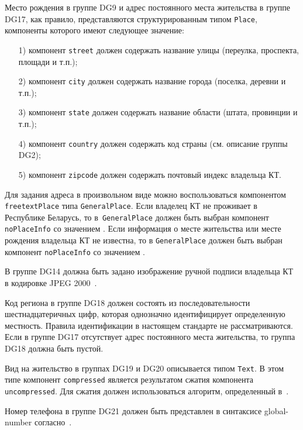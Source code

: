 Место рождения в группе DG9 и адрес постоянного места жительства в группе 
DG17, как правило, представляются структурированным типом \verb|Place|, 
компоненты которого имеют следующее значение: 

\begin{enumerate}
\item[1)]
компонент \verb|street| должен содержать название улицы (переулка, 
проспекта, площади и т.п.); 
\item[2)]
компонент \verb|city| должен содержать название города (поселка, деревни и т.п.); 
\item[3)]
компонент \verb|state| должен содержать название области (штата, провинции и т.п.);
\item[4)]
компонент \verb|country| должен содержать код страны (см. описание группы DG2);
\item[5)]
компонент \verb|zipcode| должен содержать почтовый индекс владельца КТ.
\end{enumerate}

Для задания адреса в произвольном виде можно воспользоваться компонентом 
\verb|freetextPlace| типа \verb|GeneralPlace|. Если владелец КТ не проживает в 
Республике Беларусь, то в~\verb|GeneralPlace| должен быть выбран компонент 
\verb|noPlaceInfo| со значением . 
Если информация о месте жительства или месте рождения владельца 
КТ не известна, то в \verb|GeneralPlace| 
должен быть выбран компонент \verb|noPlaceInfo| со значением 
. 


В группе DG14 должна быть задано изображение ручной подписи
владельца КТ в кодировке JPEG 2000~\cite{JPEG2000}.

Код региона в группе DG18 должен состоять из последовательности 
шестнадцатеричных цифр, которая однозначно идентифицирует определенную 
местность. Правила идентификации в настоящем стандарте не рассматриваются. 
Если в группе DG17 отсутствует адрес постоянного места жительства, то 
группа DG18 должна быть пустой. 

Вид на жительство в группах DG19 и DG20 описывается типом \verb|Text|. 
В этом типе компонент \verb|compressed| является результатом сжатия компонента 
\verb|uncompressed|. Для сжатия должен использоваться алгоритм, 
определенный в~\cite{DEFLATE}. 

Номер телефона в группе DG21 должен быть
представлен в синтаксисе global-number согласно~\cite{RFC3966}. 

